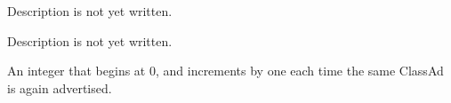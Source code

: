 \begin{description}
\item[\AdAttr{RunningJobs}:] Description is not yet written.

\item[\AdAttr{UpdateInterval}:] Description is not yet written.

\item[\AdAttr{UpdateSequenceNumber}:] An integer that begins at 0,
   and increments by one each time the same ClassAd is again advertised.

\end{description}

